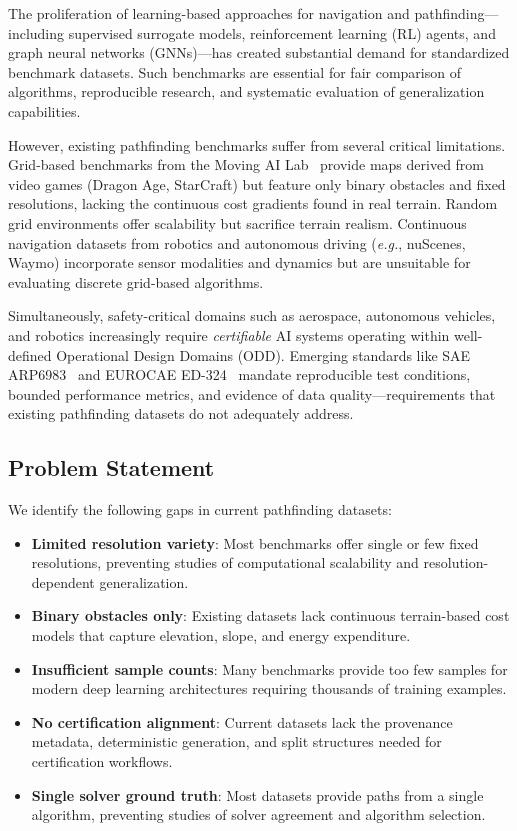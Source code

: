 \documentclass{article}
\providecommand{\eg}{\textit{e.g.}}
\begin{document}
The proliferation of learning-based approaches for navigation and pathfinding---including supervised surrogate models, reinforcement learning (RL) agents, and graph neural networks (GNNs)---has created substantial demand for standardized benchmark datasets. Such benchmarks are essential for fair comparison of algorithms, reproducible research, and systematic evaluation of generalization capabilities.

However, existing pathfinding benchmarks suffer from several critical limitations. Grid-based benchmarks from the Moving AI Lab~\cite{sturtevant2012benchmarks} provide maps derived from video games (Dragon Age, StarCraft) but feature only binary obstacles and fixed resolutions, lacking the continuous cost gradients found in real terrain. Random grid environments offer scalability but sacrifice terrain realism. Continuous navigation datasets from robotics and autonomous driving (\eg, nuScenes, Waymo) incorporate sensor modalities and dynamics but are unsuitable for evaluating discrete grid-based algorithms.

Simultaneously, safety-critical domains such as aerospace, autonomous vehicles, and robotics increasingly require \emph{certifiable} AI systems operating within well-defined Operational Design Domains (ODD). Emerging standards like SAE ARP6983~\cite{arp6983} and EUROCAE ED-324~\cite{ed324} mandate reproducible test conditions, bounded performance metrics, and evidence of data quality---requirements that existing pathfinding datasets do not adequately address.

\subsection{Problem Statement}

We identify the following gaps in current pathfinding datasets:
\begin{itemize}[noitemsep]
    \item \textbf{Limited resolution variety}: Most benchmarks offer single or few fixed resolutions, preventing studies of computational scalability and resolution-dependent generalization.
    \item \textbf{Binary obstacles only}: Existing datasets lack continuous terrain-based cost models that capture elevation, slope, and energy expenditure.
    \item \textbf{Insufficient sample counts}: Many benchmarks provide too few samples for modern deep learning architectures requiring thousands of training examples.
    \item \textbf{No certification alignment}: Current datasets lack the provenance metadata, deterministic generation, and split structures needed for certification workflows.
    \item \textbf{Single solver ground truth}: Most datasets provide paths from a single algorithm, preventing studies of solver agreement and algorithm selection.
\end{itemize}
\end{document}
